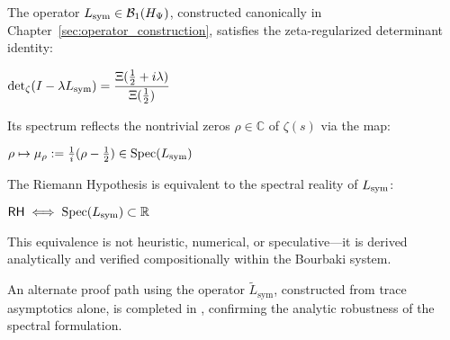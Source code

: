 \begin{tcolorbox}[colback=gray!2!white, colframe=black!50, title={\textbf{Canonical Equivalence — RH via Spectral Reality}}, breakable]

The operator \( L_{\mathrm{sym}} \in \mathcal{B}_1(H_{\Psi}) \), constructed canonically in Chapter~\ref{sec:operator_construction}, satisfies the zeta-regularized determinant identity:
\begin{adjustbox}{max width=\linewidth}
$\displaystyle \det\nolimits_{\zeta}(I - \lambda L_{\mathrm{sym}}) = \frac{\Xi(\tfrac{1}{2} + i\lambda)}{\Xi(\tfrac{1}{2})}$
\end{adjustbox}

\medskip

Its spectrum reflects the nontrivial zeros \( \rho \in \mathbb{C} \) of \( \zeta(s) \) via the map:
\begin{adjustbox}{max width=\linewidth}
$\displaystyle \rho \mapsto \mu_\rho := \tfrac{1}{i}(\rho - \tfrac{1}{2}) \in \operatorname{Spec}(L_{\mathrm{sym}})$
\end{adjustbox}

\medskip

The Riemann Hypothesis is equivalent to the spectral reality of \( L_{\mathrm{sym}} \):
\begin{adjustbox}{max width=\linewidth}
$\displaystyle \mathsf{RH} \iff \operatorname{Spec}(L_{\mathrm{sym}}) \subset \mathbb{R}$
\end{adjustbox}

\medskip

This equivalence is not heuristic, numerical, or speculative—it is derived analytically and verified compositionally within the Bourbaki system.

\medskip

An alternate proof path using the operator \( \tilde{L}_{\mathrm{sym}} \), constructed from trace asymptotics alone, is completed in , confirming the analytic robustness of the spectral formulation.

\end{tcolorbox}


